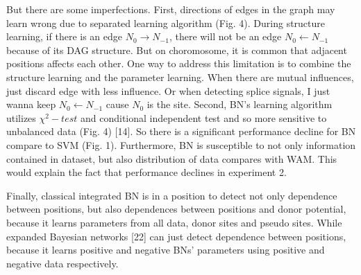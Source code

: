 \documentclass[11pt]{article}
\begin{document}
But there are some imperfections. First, directions of edges in the
graph may learn wrong due to separated learning algorithm (Fig. 4).
During structure learning, if there is an edge
\(N_0 \rightarrow N_{-1}\), there will not be an edge
\(N_0 \leftarrow N_{-1}\) because of its DAG structure. But on
choromosome, it is common that adjacent positions affects each other.
One way to address this limitation is to combine the structure learning
and the parameter learning. When there are mutual influences, just
discard edge with less influence. Or when detecting splice signals, I
just wanna keep \(N_{0}\leftarrow N_{-1}\) cause \(N_0\) is the site.
Second, BN's learning algorithm utilizes \(\chi^2-test\) and conditional
independent test and so more sensitive to unbalanced data (Fig. 4)
{[}14{]}. So there is a significant performance decline for BN compare
to SVM (Fig. 1). Furthermore, BN is susceptible to not only information
contained in dataset, but also distribution of data compares with WAM.
This would explain the fact that performance declines in experiment 2.

Finally, classical integrated BN is in a position to detect not only
dependence between positions, but also dependences between positions and
donor potential, because it learns parameters from all data, donor sites
and pseudo sites. While expanded Bayesian networks {[}22{]} can just
detect dependence between positions, because it learns positive and
negative BNs' parameters using positive and negative data respectively.
\end{document}
